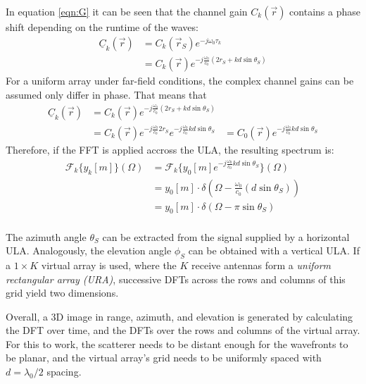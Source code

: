 In equation \ref{eqn:G} it can be seen that the channel gain $C_k(\vec r)$
contains a phase shift depending on the runtime of the waves:
\begin{align}
    \underline{C}_k(\vec r) &= C_k(\vec r_S)e^{-j\omega_0\tau_k} \\
                &= C_k(\vec r)e^{-j\frac{\omega_0}{c_0}(2r_S + kd\sin\theta_S)}
\end{align}
For a uniform array under far-field conditions,
the complex channel gains can be assumed only differ in phase. That means that
\begin{align}
    \underline{C}_k(\vec r) &= C_k(\vec r)e^{-j\frac{\omega_0}{c_0}(2r_S + kd\sin\theta_S)} \\
                            &= C_k(\vec r)e^{-j\frac{\omega_0}{c_0}2r_S}e^{-j\frac{\omega_0}{c_0}kd\sin\theta_S}
                            &= C_0(\vec r)e^{-j\frac{\omega_0}{c_0}kd\sin\theta_S}
 \end{align}
Therefore, if the FFT is applied accross the ULA, the resulting spectrum is:
\begin{align}
    \mathcal{F}_k\{y_k[m]\}(\Omega) & = \mathcal{F}_k\{y_0[m]e^{-j \frac{\omega_0}{c_0}kd\sin\theta_S}\}(\Omega)      \\
                                    & = y_0[m] \cdot \delta \left(\Omega -\frac{\omega_0}{c_0}(d\sin\theta_S) \right) \\
                                    & = y_0[m] \cdot \delta \left(\Omega - \pi\sin\theta_S \right)                    \\
\end{align}

The azimuth angle $\theta_S$ can be extracted from the signal supplied by a horizontal ULA.
Analogously, the elevation angle $\phi_S$ can be obtained with a vertical ULA.
If a $1\times K$ virtual array is used, where the $K$ receive antennas form a \emph{uniform rectangular array (URA)},
successive DFTs across the rows and columns of this grid yield two dimensions.

Overall, a 3D image in range, azimuth, and elevation is generated
by calculating the DFT over time, and the DFTs over the rows and columns of the virtual array.
For this to work, the scatterer needs to be distant enough for the wavefronts to be planar,
and the virtual array's grid needs to be uniformly spaced with $d=\lambda_0/2$ spacing.

